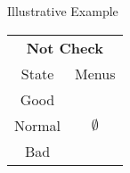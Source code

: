 \documentclass[usenames,dvipsnames,aspectratio=169,11pt, envcountsect, handout]{beamer}
\begin{document}
\begin{frame}[noframenumbering]{Illustrative Example}
\begin{table}[H]
		\begin{minipage}{0.29\textwidth}
			\centering
			\begin{tabular}{c | c}
				\multicolumn{2}{c}{\textbf{Not Check}}   \\
				State  & Menus                           \\
				\hline
				Good   & \multirow{3}{*}{ \(\emptyset\)} \\
				Normal &                                 \\
				Bad    &                                 \\
			\end{tabular}
			\vspace{0.5cm} %
		\end{minipage}
	\end{table}

\end{frame}
\end{document}
